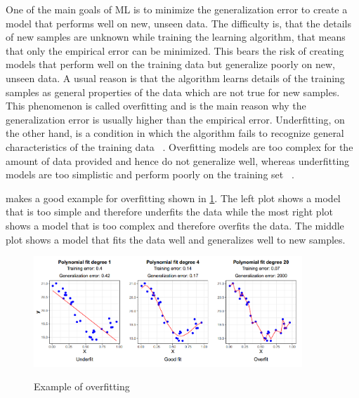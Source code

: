 One of the main goals of \ac{ML} is to minimize the generalization error to create a model that performs well
on new, unseen data.
The difficulty is, that the details of new samples are unknown while training the learning algorithm, that means that
only the empirical error can be minimized.
This bears the risk of creating models that perform well on the training data but generalize poorly on new, unseen data.
A usual reason is that the algorithm learns details of the training samples as general properties of the data
which are not true for new samples.
This phenomenon is called overfitting and is the main reason why the generalization error is usually higher than the
empirical error.
Underfitting, on the other hand, is a condition in which the algorithm fails to recognize general characteristics of
the training data
~\cite[p. 26]{zhou2021machine}.
Overfitting models are too complex for the amount of data provided and hence do not generalize well, whereas
underfitting models are too simplistic and perform poorly on the training set
~\cite[p. 28]{muller2016introduction}.

\cite{badillo2020introduction} makes a good example for overfitting shown in
\cref{fig:overfitting_example}.
The left plot shows a model that is too simple and therefore underfits the data while the most right plot shows a model
that is too complex and therefore overfits the data.
The middle plot shows a model that fits the data well and generalizes well to new samples.

\begin{figure}[h]
    \begin{tcolorbox}[arc=0pt,boxrule=0.5pt, color=white]
        \centering
        \includegraphics[trim=left botm right top, width=0.9\textwidth]
        {chap2/images/overfitting_example}
        \label{fig:overfitting_example}
    \end{tcolorbox}
    \caption{Example of overfitting~\cite[p. 876]{badillo2020introduction}}
\end{figure}

